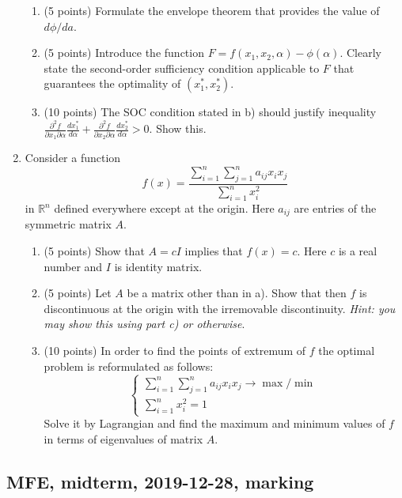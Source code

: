 \begin{enumerate}
\begin{enumerate}
  \item (5 points) Formulate the envelope theorem that provides the value of $d\phi/da$.
  \item  (5 points) Introduce the function $F=f(x_1, x_2, \alpha) - \phi(\alpha)$. 
  Clearly state the second-order sufficiency condition applicable to $F$ 
  that guarantees the optimality of $(x_1^*, x_2^*)$. 
  \item (10 points) The SOC condition stated in b) should justify inequality
  $\frac{\partial^2 f}{\partial x_1 \partial \alpha} \frac{dx_1^*}{d\alpha} +
  \frac{\partial^2 f}{\partial x_2 \partial \alpha} \frac{dx_2^*}{d\alpha} > 0$. 
  Show this. 
\end{enumerate}


\item Consider a function 
\[
  f(x) = \frac{\sum_{i=1}^n \sum_{j=1}^n a_{ij}x_i x_j}
{\sum_{i=1}^n x_i^2}
\]
in $\mathbb{R}^n$ defined everywhere except at the origin. 
Here $a_{ij}$ are entries of the symmetric matrix $A$. 
\begin{enumerate}
\item (5 points) Show that $A=cI$ implies that $f(x)=c$. 
Here $c$ is a real number and $I$ is identity matrix.
\item (5 points) Let $A$ be a matrix other than in a). 
Show that then $f$ is discontinuous at the origin with the irremovable discontinuity. 
\textit{Hint: you may show this using part c) or otherwise}.
\item (10 points) In order to find the points of extremum of $f$ 
the optimal problem is reformulated as follows:
\[
\begin{cases}
  \sum_{i=1}^n \sum_{j=1}^n a_{ij}x_i x_j \to \max / \min \\
  \sum_{i=1}^n x_i^2 = 1
\end{cases}
\] 
Solve it by Lagrangian and find the maximum and minimum values of $f$ 
in terms of eigenvalues of matrix $A$.
\end{enumerate}


\end{enumerate}



\subsection{MFE, midterm, 2019-12-28, marking}

